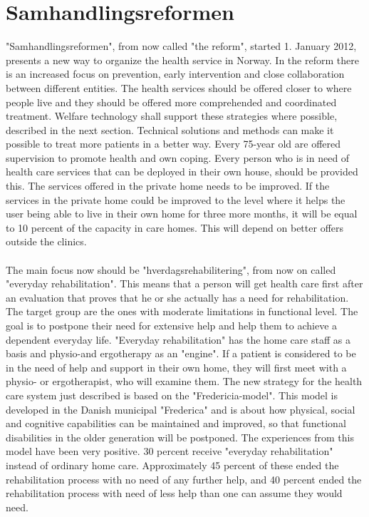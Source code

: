 \section{Samhandlingsreformen}
"Samhandlingsreformen", from now called "the reform", started 1. January 2012, presents a new way to organize the health service in Norway. In the reform there is an increased focus on prevention, early intervention and close collaboration between different entities. The health services should be offered closer to where people live and they should be offered more comprehended and coordinated treatment. Welfare technology shall support these strategies where possible, described in the next section. Technical solutions and methods can make it possible to treat more patients in a better way. Every 75-year old are offered supervision to promote health and own coping. Every person who is in need of health care services that can be deployed in their own house, should be provided this. The services offered in the private home needs to be improved. If the services in the private home could be improved to the level where it helps the user being able to live in their own home for three more months, it will be equal to 10 percent of the capacity in care homes. This will depend on better offers outside the clinics.\\ \\ The main focus now should be "hverdagsrehabilitering", from now on called  "everyday rehabilitation". This means that a person will get health care first after an evaluation that proves that he or she actually has a need for rehabilitation. The target group are the ones with moderate limitations in functional level. The goal is to postpone their need for extensive help and help them to achieve a dependent everyday life.  "Everyday rehabilitation" has the home care staff as a basis and physio-and ergotherapy as an "engine". If a patient is considered to be in the need of help and support in their own home, they will first meet with a physio- or ergotherapist, who will examine them. The new strategy for the health care system just described is based on the "Fredericia-model". This model is developed in the Danish municipal "Frederica" and is about how physical, social and cognitive capabilities can be maintained and improved, so that functional disabilities in the older generation will be postponed. The experiences from this model have been very positive. 30 percent receive "everyday rehabilitation" instead of ordinary home care. Approximately 45 percent of these ended the rehabilitation process with no need of any further help, and 40 percent ended the rehabilitation process with need of less help than one can assume they would need.\cite{budsjett}\cite{regjering}
